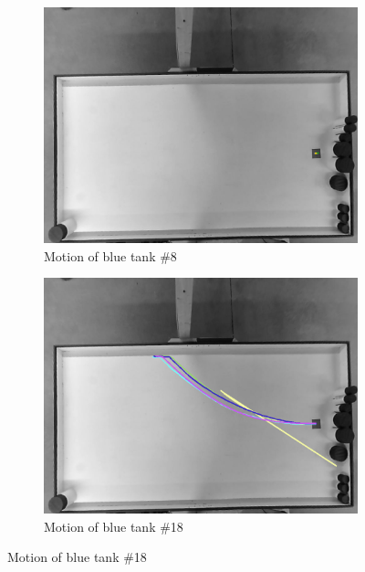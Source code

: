 \begin{figure}
	\begin{subfigure}[t]{0.47\textwidth}
		\includegraphics[width=\textwidth]{../hardwareX_paper/robot_8.png}
		\caption{Motion of blue tank \#8}
	\end{subfigure}
	\begin{subfigure}[t]{0.47\textwidth}
		\includegraphics[width=\textwidth]{../hardwareX_paper/robot_18.png}
		\caption{Motion of blue tank \#18}
	\end{subfigure}
	

\end{figure}
